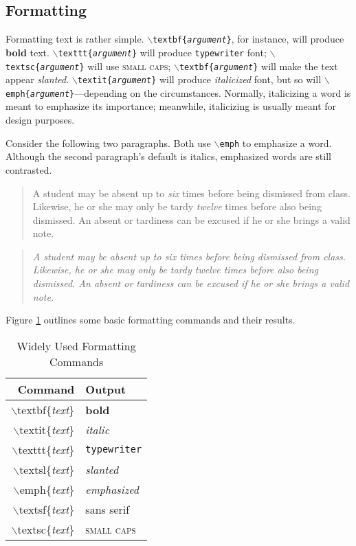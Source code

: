 \documentclass{article}
\begin{document}
\subsection{Formatting}

Formatting text is rather simple. \texttt{$\backslash$textbf\{\textit{argument}\}}, for instance, will produce \textbf{bold} text. \texttt{$\backslash$texttt\{\textit{argument}\}} will produce \texttt{typewriter} font; \texttt{$\backslash$textsc\{\textit{argument}\}} will use \textsc{small caps}; \texttt{$\backslash$textbf\{\textsl{argument}\}} will make the text appear \textsl{slanted}. \texttt{$\backslash$textit\{\textit{argument}\}} will produce \textit{italicized} font, but so will \texttt{$\backslash$emph\{\textit{argument}\}}---depending on the circumstances. Normally, italicizing a word is meant to emphasize its importance; meanwhile, italicizing is usually meant for design purposes.

Consider the following two paragraphs. Both use \texttt{$\backslash$emph} to emphasize a word. Although the second paragraph's default is italics, emphasized words are still contrasted.

\begin{quote}
A student may be absent up to \emph{six} times before being dismissed from class. Likewise, he or she may only be tardy \emph{twelve} times before also being dismissed. An absent or tardiness can be excused if he or she brings a valid note.
\end{quote}

\begin{quote}
\textit{A student may be absent up to \emph{six} times before being dismissed from class. Likewise, he or she may only be tardy \emph{twelve} times before also being dismissed. An absent or tardiness can be excused if he or she brings a valid note.}
\end{quote}

Figure \ref{tbl:format} outlines some basic formatting commands and their results.

\begin{table}[!h] \caption{Widely Used Formatting Commands} \label{tbl:format}
	\begin{center}
		\begin{tabular}{r l} 
		\hline
		Command & Output \\
		\hline
		$\backslash$textbf\{\textit{text}\} & \textbf{bold} \\
		$\backslash$textit\{\textit{text}\} & \textit{italic} \\
		$\backslash$texttt\{\textit{text}\} & \texttt{typewriter} \\
		$\backslash$textsl\{\textit{text}\} & \textsl{slanted} \\
		$\backslash$emph\{\textit{text}\} 	& \emph{emphasized} \\
		$\backslash$textsf\{\textit{text}\} & \textsf{sans serif} \\
		$\backslash$textsc\{\textit{text}\} & \textsc{small caps} \\ 
		\end{tabular}
	\end{center}		
\end{table}
\end{document}
